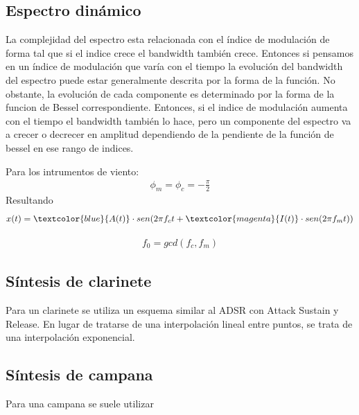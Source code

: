 \documentclass[assd_tp2_main.tex]{subfiles}
\begin{document}
\subsection{Espectro dinámico}
La complejidad del espectro esta relacionada con el índice de modulación de forma tal que si el indice crece el bandwidth también crece. Entonces si pensamos en un índice de modulación que varía con el tiempo la evolución del bandwidth del espectro puede estar generalmente descrita por la forma de la función.
No obstante, la evolución de cada componente es determinado por la forma de la funcion de Bessel correspondiente.
Entonces, si el indice de modulación aumenta con el tiempo el bandwidth también lo hace, pero un componente del espectro va a crecer o decrecer en amplitud dependiendo de la pendiente de la función de bessel en ese rango de indices.




Para los intrumentos de viento:
\begin{eqnarray*}
\displaystyle \phi_m=\phi_c=-\frac{\pi}{2}
\end{eqnarray*}
Resultando
\begin{eqnarray*}
\textstyle x(t)=\textcolor{blue}{A(t)}\cdot sen(2\pi f_c t+\textcolor{magenta}{I(t)}\cdot sen(2\pi f_mt))
\end{eqnarray*}



 
\begin{eqnarray*}
\displaystyle f_0=gcd(f_c,f_m)
\end{eqnarray*}

\subsection{Síntesis de clarinete}
Para un clarinete se utiliza un esquema similar al ADSR con Attack Sustain y Release. En lugar de tratarse de una interpolación lineal entre puntos, se trata de una interpolación exponencial.

\subsection{Síntesis de campana}
Para una campana se suele utilizar
\end{document}
